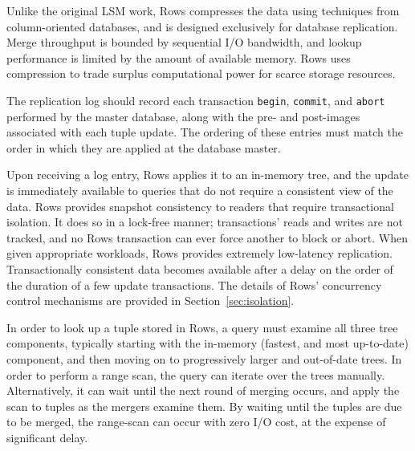 \documentclass{sig-alternate-sigmod08}
\newcommand{\rows}{Rows\xspace}
\newcommand{\rowss}{Rows'\xspace}
\begin{document}
Unlike the original LSM work, \rows compresses the data using
techniques from column-oriented databases, and is designed exclusively
for database replication.  Merge throughput is bounded by sequential
I/O bandwidth, and lookup performance is limited by the amount of
available memory.  \rows uses compression to trade surplus
computational power for scarce storage resources.

The replication log should record each transaction {\tt begin}, {\tt commit}, and
{\tt abort} performed by the master database, along with the pre- and
post-images associated with each tuple update.  The ordering of these
entries must match the order in which they are applied at the
database master.

Upon receiving a log entry, \rows applies it to an in-memory tree, and
the update is immediately available to queries that do not require a
consistent view of the data.  \rows provides snapshot consistency to
readers that require transactional isolation.  It does so in a
lock-free manner; transactions' reads and writes are not tracked, and
no \rows transaction can ever force another to block or abort.  When
given appropriate workloads, \rows provides extremely low-latency
replication.  Transactionally consistent data becomes available after
a delay on the order of the duration of a few update transactions.
The details of \rowss concurrency control mechanisms are provided in
Section~\ref{sec:isolation}.


In order to look up a tuple stored in \rows, a query must examine all
three tree components, typically starting with the in-memory (fastest, and most
up-to-date) component, and then moving on to progressively larger and
out-of-date trees.  In order to perform a range scan, the query can
iterate over the trees manually.  Alternatively, it can wait until the next round
of merging occurs, and apply the scan to tuples as the mergers examine
them.  By waiting until the tuples are due to be merged, the
range-scan can occur with zero I/O cost, at the expense of significant
delay.
\end{document}
